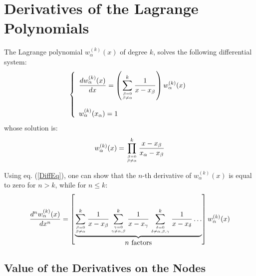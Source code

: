 \documentclass[10pt,a4paper]{article}
\begin{document}
\section{Derivatives of the Lagrange Polynomials}\label{DerivativesLP}

The Lagrange polynomial $w_\alpha^{(k)}(x)$ of degree $k$, solves the
following differential system:
\begin{equation}\label{DiffEq}
\left\{
\begin{array}{l}
\displaystyle \frac{d w_\alpha^{(k)}(x)}{dx}
=\left(\sum_{\beta=0\atop \beta\neq\alpha}^k\frac{1}{x-x_\beta}\right)
w_\alpha^{(k)}(x)\\
\\
w_\alpha^{(k)}(x_\alpha) = 1
\end{array}
\right.
 \end{equation}
whose solution is:
\begin{equation}
w_\alpha^{(k)}(x) = \prod_{\beta=0\atop \beta\neq\alpha}^k\frac{x-x_\beta}{x_\alpha-x_\beta}
\end{equation}

Using eq. (\ref{DiffEq}), one can show that the $n$-th derivative of
$w_\alpha^{(k)}(x)$ is equal to zero for $n>k$, while for $n\leq k$:
\begin{equation}\label{NthDerivative}
\frac{d^n w_\alpha^{(k)}(x)}{dx^n}
=\left[\underbrace{\sum_{\beta=0\atop \beta\neq\alpha}^k\frac{1}{x-x_\beta}
\sum_{\gamma=0\atop \gamma\neq\alpha,\beta}^k\frac{1}{x-x_\gamma}
\sum_{\delta=0\atop \delta\neq\alpha,\beta,\gamma}^k\frac{1}{x-x_\delta}
\dots}_{\mbox{$n$ factors}}\right]
w_\alpha^{(k)}(x)
\end{equation}

\subsection{Value of the Derivatives on the Nodes}
\end{document}
